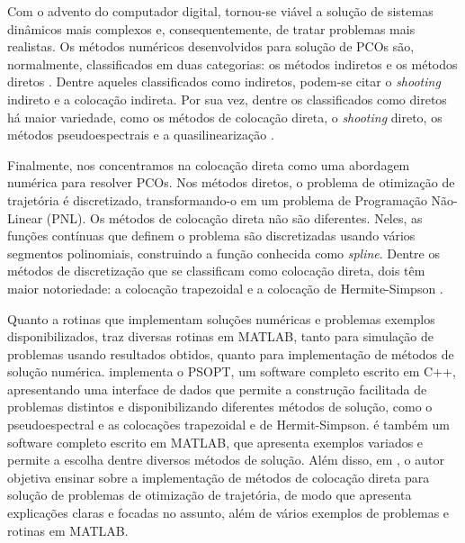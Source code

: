 
Com o advento do computador digital, tornou-se viável a solução de sistemas dinâmicos mais complexos e, consequentemente, de tratar problemas mais realistas. Os métodos numéricos desenvolvidos para solução de PCOs são, normalmente, classificados em duas categorias: os métodos indiretos e os métodos diretos \cite{betts_practical_2010}. Dentre aqueles classificados como indiretos, podem-se citar o \textit{shooting} indireto e a colocação indireta. Por sua vez, dentre os classificados como diretos há maior variedade, como os métodos de colocação direta, o \textit{shooting} direto, os métodos pseudoespectrais \cite{betts_survey_1998} e a quasilinearização \cite{paine_application_1967}. 



Finalmente, nos concentramos na colocação direta como uma abordagem numérica para resolver PCOs. Nos métodos diretos, o problema de otimização de trajetória é discretizado, transformando-o em um problema de Programação Não-Linear (PNL). Os métodos de colocação direta não são diferentes. Neles, as funções contínuas que definem o problema são discretizadas usando vários segmentos polinomiais, construindo a função conhecida como \textit{spline}. Dentre os métodos de discretização que se classificam como colocação direta, dois têm maior notoriedade: a colocação trapezoidal e a colocação de Hermite-Simpson \cite{kelly_introduction_2017, betts_practical_2010}.

Quanto a rotinas que implementam soluções numéricas e problemas exemplos disponibilizados, \cite{lewis_optimal_2012} traz diversas rotinas em MATLAB, tanto para simulação de problemas usando resultados obtidos, quanto para implementação de métodos de solução numérica. \cite{becerra_psopt_2022} implementa o PSOPT, um software completo escrito em C++, apresentando uma interface de dados que permite a construção facilitada de problemas distintos e disponibilizando diferentes métodos de solução, como o pseudoespectral e as colocações trapezoidal e de Hermit-Simpson. \cite{kelly_optimtraj_2022} é também um software completo escrito em MATLAB, que apresenta exemplos variados e permite a escolha dentre diversos métodos de solução. Além disso, em \cite{kelly_introduction_2017}, o autor objetiva ensinar sobre a implementação de métodos de colocação direta para solução de problemas de otimização de trajetória, de modo que apresenta explicações claras e focadas no assunto, além de vários exemplos de problemas e rotinas em MATLAB.



